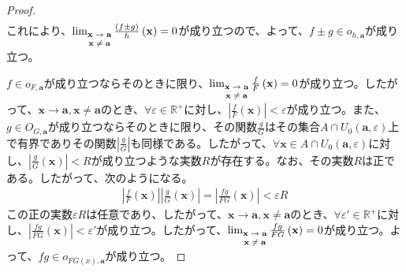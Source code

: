 \documentclass[dvipdfmx]{jsarticle}
\begin{document}
\begin{proof}
\begin{align*}
\end{align*}
これにより、$\lim_{\scriptsize \begin{matrix}
\mathbf{x} \rightarrow \mathbf{a} \\
\mathbf{x} \neq \mathbf{a} \\
\end{matrix}}{\frac{(f \pm g)}{h}\left( \mathbf{x} \right)} = 0$が成り立つので、よって、$f \pm g \in o_{h,\mathbf{a}}$が成り立つ。\par
$f \in o_{F,\mathbf{a}}$が成り立つならそのときに限り、$\lim_{\scriptsize \begin{matrix}
\mathbf{x} \rightarrow \mathbf{a} \\
\mathbf{x} \neq \mathbf{a} \\
\end{matrix}}{\frac{f}{F}\left( \mathbf{x} \right)} = 0$が成り立つ。したがって、$\mathbf{x} \rightarrow \mathbf{a},\mathbf{x} \neq \mathbf{a}$のとき、$\forall\varepsilon \in \mathbb{R}^{+}$に対し、$\left| \frac{f}{F}\left( \mathbf{x} \right) \right| < \varepsilon$が成り立つ。また、$g \in O_{G,\mathbf{a}}$が成り立つならそのときに限り、その関数$\frac{g}{G}$はその集合$A \cap U_{0}\left( \mathbf{a},\varepsilon \right)$上で有界でありその関数$\left| \frac{g}{G} \right|$も同様である。したがって、$\forall\mathbf{x} \in A \cap U_{0}\left( \mathbf{a},\varepsilon \right)$に対し、$\left| \frac{g}{G}\left( \mathbf{x} \right) \right| < R$が成り立つような実数$R$が存在する。なお、その実数$R$は正である。したがって、次のようになる。
\begin{align*}
\left| \frac{f}{F}\left( \mathbf{x} \right) \right|\left| \frac{g}{G}\left( \mathbf{x} \right) \right| = \left| \frac{fg}{FG}\left( \mathbf{x} \right) \right| < \varepsilon R
\end{align*}
この正の実数$\varepsilon R$は任意であり、したがって、$\mathbf{x} \rightarrow \mathbf{a},\mathbf{x} \neq \mathbf{a}$のとき、$\forall\varepsilon' \in \mathbb{R}^{+}$に対し、$\left| \frac{fg}{FG}\left( \mathbf{x} \right) \right| < \varepsilon'$が成り立つ。したがって、$\lim_{\scriptsize \begin{matrix}
\mathbf{x} \rightarrow \mathbf{a} \\
\mathbf{x} \neq \mathbf{a} \\
\end{matrix}}{\frac{fg}{FG}\left( \mathbf{x} \right)} = 0$が成り立つ。よって、$fg \in o_{FG(x),\mathbf{a}}$が成り立つ。
\end{proof}
\end{document}
